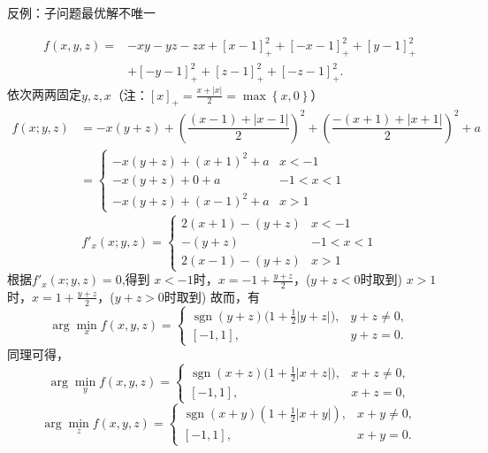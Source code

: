 \begin{example}
    反例：子问题最优解不唯一
    \begin{solution}
        \[
            \begin{aligned}
                f(x,y,z)=&-xy-yz-zx+[x-1]_{+}^{2}+[-x-1]_{+}^{2}+[y-1]_{+}^{2}\\
                &+[-y-1]_{+}^{2}+[z-1]_{+}^{2}+[-z-1]_{+}^{2}.
            \end{aligned}
        \]
        依次两两固定$y,z,x$\colorbox{cyan!50}{（注：$[x]_{+} = \frac{x+|x|}{2} = \max\left\{ x,0 \right\}$）}
        \[
            \begin{aligned}
                f(x;y,z) &= -x(y+z)+\left( \dfrac{(x-1)+|x-1|}{2} \right)^2+\left( \dfrac{-(x+1)+|x+1|}{2} \right)^2 + a \\
                &=\begin{cases}
                    -x(y+z)+(x+1)^2+a & x<-1 \\
                    -x(y+z)+0+a & -1<x<1 \\
                    -x(y+z)+ (x-1)^2+a & x>1
                \end{cases}
            \end{aligned}
        \]
        \[
            f'_x(x;y,z) =\begin{cases}
                2(x+1)-(y+z) & x<-1 \\
                -(y+z)& -1<x<1 \\
                2(x-1)-(y+z) & x>1
            \end{cases}
        \]
        根据$f'_x(x;y,z) = 0$,得到
        \newline
        $x<-1$时，$x = -1+\frac{y+z}{2}$，(\colorbox{cyan!50}{$y+z<0$时取到})
        \newline
        $x>1$时，$x = 1+\frac{y+z}{2}$，(\colorbox{cyan!50}{$y+z>0$时取到})
        故而，有
        \[
            \arg\min_xf(x,y,z)=
            \begin{cases}
                \operatorname{sgn}(y+z)\big(1+\frac{1}{2}|y+z|\big),&y+z\neq0,\\
                [-1,1],&y+z=0.
            \end{cases}
        \]
        同理可得，
        \[
            \arg\min\limits_{y}f(x,y,z)=
            \begin{cases}
                \operatorname{sgn}(x+z)\big(1+\frac{1}{2}|x+z|\big),&x+z\neq0,\\
                [-1,1],&x+z=0,
            \end{cases}
        \]
        \[
            \arg\min_zf(x,y,z)=
            \begin{cases}
                \operatorname{sgn}(x+y)(1+\frac{1}{2}|x+y|),&x+y\neq0,\\
                [-1,1],&x+y=0.
            \end{cases}    
        \]
    \end{solution}
\end{example}